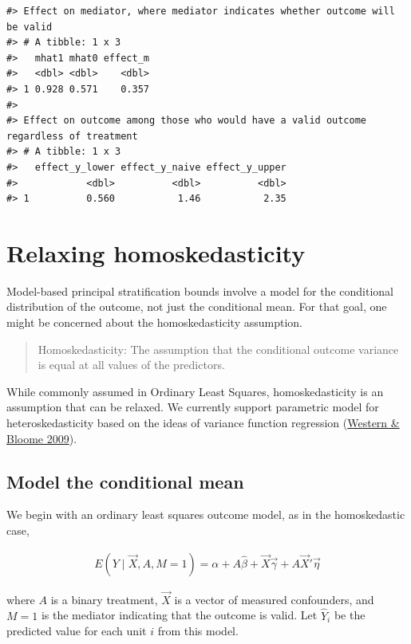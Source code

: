 \documentclass[
]{book}
\begin{document}
\begin{verbatim}
#> Effect on mediator, where mediator indicates whether outcome will be valid
#> # A tibble: 1 x 3
#>   mhat1 mhat0 effect_m
#>   <dbl> <dbl>    <dbl>
#> 1 0.928 0.571    0.357
#> 
#> Effect on outcome among those who would have a valid outcome regardless of treatment
#> # A tibble: 1 x 3
#>   effect_y_lower effect_y_naive effect_y_upper
#>            <dbl>          <dbl>          <dbl>
#> 1          0.560           1.46           2.35
\end{verbatim}

\hypertarget{relaxing-homoskedasticity}{%
\chapter{Relaxing homoskedasticity}\label{relaxing-homoskedasticity}}

Model-based principal stratification bounds involve a model for the conditional distribution of the outcome, not just the conditional mean. For that goal, one might be concerned about the homoskedasticity assumption.

\begin{quote}
Homoskedasticity: The assumption that the conditional outcome variance is equal at all values of the predictors.
\end{quote}

While commonly assumed in Ordinary Least Squares, homoskedasticity is an assumption that can be relaxed. We currently support parametric model for heteroskedasticity based on the ideas of variance function regression (\href{https://doi.org/10.1111/j.1467-9531.2009.01222.x}{Western \& Bloome 2009}).

\hypertarget{model-the-conditional-mean}{%
\section{Model the conditional mean}\label{model-the-conditional-mean}}

We begin with an ordinary least squares outcome model, as in the homoskedastic case,

\[\begin{aligned}
E(Y\mid \vec{X},A,M = 1) =\alpha + A\hat\beta  + \vec{X}\vec\gamma + A\vec{X}'\vec\eta
\end{aligned}\]

where \(A\) is a binary treatment, \(\vec{X}\) is a vector of measured confounders, and \(M = 1\) is the mediator indicating that the outcome is valid. Let \(\hat{Y}_i\) be the predicted value for each unit \(i\) from this model.
\end{document}
